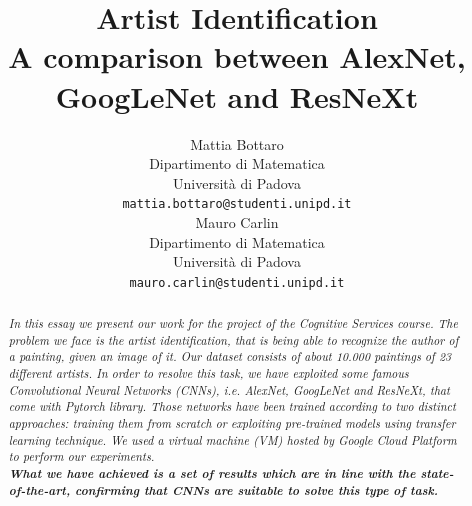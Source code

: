 \documentclass{article}
\title{Artist Identification	\\  A comparison between AlexNet, GoogLeNet and ResNeXt}
\author{
  Mattia Bottaro \\
  Dipartimento  di Matematica\\
  Università di Padova \\
  \texttt{mattia.bottaro@studenti.unipd.it} \\
   \And
  Mauro Carlin \\
Dipartimento  di Matematica\\
Università di Padova \\
\texttt{mauro.carlin@studenti.unipd.it} \\
}
\begin{document}
\maketitle

\begin{abstract}
	\textit{In this essay we present our work for the project of the Cognitive Services course.
	The problem we face is the artist identification, that is being able to recognize the author of a painting, given an image of it. Our dataset consists of about 10.000 paintings of 23 different artists.
	In order to resolve this task, we have exploited some famous Convolutional Neural Networks (CNNs), i.e. AlexNet, GoogLeNet and ResNeXt, that come with \textit{Pytorch} library. Those networks have been trained according to two distinct approaches: training them from scratch or exploiting pre-trained models using transfer learning technique. We used a virtual machine (VM) hosted by \textit{Google Cloud Platform} to perform our experiments.\\
	\textbf{What we have achieved is a set of results which are in line with the state-of-the-art, confirming that CNNs are suitable to solve this type of task.}}
\end{abstract}


\end{document}
